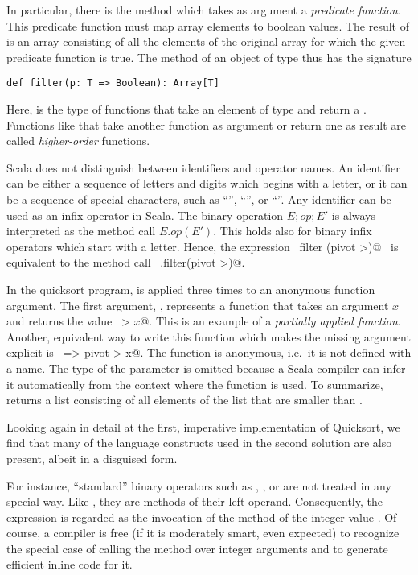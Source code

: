 In particular, there is the method  which takes as
argument a {\em predicate function}. This predicate function must map
array elements to boolean values. The result of  is an
array consisting of all the elements of the original array for which the
given predicate function is true. The  method of an object
of type  thus has the signature

\begin{lstlisting}
def filter(p: T => Boolean): Array[T]
\end{lstlisting}

Here,  is the type of functions that take an element
of type  and return a .  Functions like
 that take another function as argument or return one as
result are called {\em higher-order} functions.

Scala does not distinguish between identifiers and operator names. An
identifier can be either a sequence of letters and digits which begins
with a letter, or it can be a sequence of special characters, such as
``\code{+}'', ``\code{*}'', or ``\code{:}''.  Any identifier can
be used as an infix operator in Scala.  The binary operation $E;op;E'$
is always interpreted as the method call $E.op(E')$. This holds also
for binary infix operators which start with a letter. Hence, the
expression ~\lstinline@xs filter (pivot >)@~ is equivalent to the
method call ~\lstinline@xs.filter(pivot >)@.

In the quicksort program,  is applied three times to an
anonymous function argument.  The first argument, ,
represents a function that takes an argument $x$ and returns the value
~\lstinline@pivot > $x$@. This is an example of a {\em partially applied
function}.  Another, equivalent way to write this function which makes
the missing argument explicit is ~\lstinline@x => pivot > x@.
The function is anonymous, i.e.\ it is not defined with a name. The
type of the  parameter is omitted because a Scala compiler can
infer it automatically from the context where the function is used. To
summarize,  returns a list consisting
of all elements of the list  that are smaller than
.

Looking again in detail at the first, imperative implementation of
Quicksort, we find that many of the language constructs used in the
second solution are also present, albeit in a disguised form.

For instance, ``standard'' binary operators such as \code{+},
\code{-}, or \code{<} are not treated in any special way. Like
, they are methods of their left operand. Consequently,
the expression  is regarded as the invocation
 of the \code{+} method of the integer value .
Of course, a compiler is free (if it is moderately smart, even expected)
to recognize the special case of calling the \code{+} method over
integer arguments and to generate efficient inline code for it.

